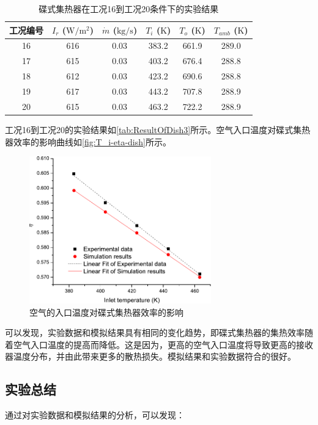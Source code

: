 \begin{table}[htbp]
\setlength{\abovecaptionskip}{0pt}
	\caption{碟式集热器在工况16到工况20条件下的实验结果}
	\centering
	\begin{tabular}{cccccc}
		\toprule
		工况编号	& $I_r$ ($\mathrm{W/m^2}$)	&	$\dot{m}$ ($\mathrm{kg/s}$)			&	$T_i$ ($\mathrm{K}$)	&	$T_o$ ($\mathrm{K}$)		&	$T_{amb}$ ($\mathrm{K}$)\\
		\midrule
		16	&	616	&	0.03	&	383.2	&	661.9	&	289.0\\
		17	&	615	&	0.03	&	403.2	&	676.4	&	288.8\\
		18	&	612	&	0.03	&	423.2	&	690.6	&	288.8	\\
		19	&	617	&	0.03	&	443.2	&	707.8	&	288.9\\
		20	&	615	&	0.03	&	463.2	&	722.2	&	288.9\\
		\bottomrule
	\end{tabular}
	\label{tab:ResultOfDish3}
\end{table}
工况16到工况20的实验结果如\autoref{tab:ResultOfDish3}所示。空气入口温度对碟式集热器效率的影响曲线如\autoref{fig:T_i-eta-dish}所示。
\begin{figure}[!ht]
\centering
\includegraphics[width=0.7\textwidth]{fig/T_i-eta-dish}
\caption{空气的入口温度对碟式集热器效率的影响}
\label{fig:T_i-eta-dish}
\end{figure}

可以发现，实验数据和模拟结果具有相同的变化趋势，即碟式集热器的集热效率随着空气入口温度的提高而降低。这是因为，更高的空气入口温度将导致更高的接收器温度分布，并由此带来更多的散热损失。模拟结果和实验数据符合的很好。

\subsection{实验总结}
通过对实验数据和模拟结果的分析，可以发现：

